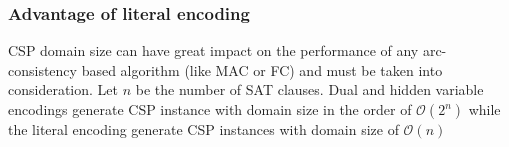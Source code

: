 \subsubsection{Advantage of literal encoding}
CSP domain size can have great impact on the performance of any arc-consistency based algorithm (like MAC or FC) and must be taken into consideration. Let $n$ be the number of SAT clauses. Dual and hidden variable encodings generate CSP instance with domain size in the order of $\mathcal{O}(2^n)$ while the literal encoding generate CSP instances with domain size of $\mathcal{O}(n)$
 